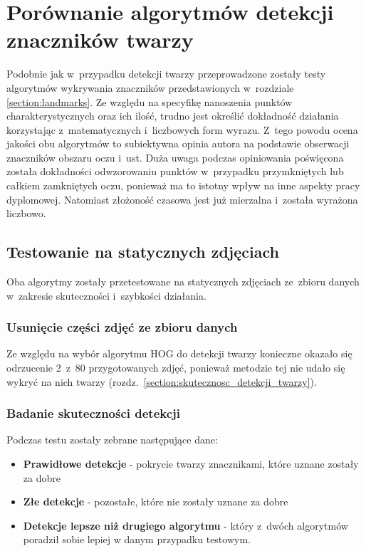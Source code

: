 \newpage

\section{Porównanie algorytmów detekcji znaczników twarzy}

Podobnie jak w~przypadku detekcji twarzy przeprowadzone zostały testy algorytmów wykrywania znaczników przedstawionych w~rozdziale \hyperref[section:landmarks]{\ref{section:landmarks}}. Ze względu na specyfikę nanoszenia punktów charakterystycznych oraz ich ilość, trudno jest określić dokładność działania korzystając z~matematycznych i~liczbowych form wyrazu. Z~tego powodu ocena jakości obu algorytmów to subiektywna opinia autora na podstawie obserwacji znaczników obszaru oczu i~ust. Duża uwaga podczas opiniowania poświęcona została dokładności odwzorowaniu punktów w~przypadku przymkniętych lub całkiem zamkniętych oczu, ponieważ ma to istotny wpływ na inne aspekty pracy dyplomowej. Natomiast złożoność czasowa jest już mierzalna i~została wyrażona liczbowo. 




\subsection{Testowanie na statycznych zdjęciach}

Oba algorytmy zostały przetestowane na statycznych zdjęciach ze~zbioru danych w~zakresie skuteczności i~szybkości działania.

\subsubsection{Usunięcie części zdjęć ze zbioru danych}

Ze względu na wybór algorytmu HOG do detekcji twarzy konieczne okazało się odrzucenie 2~z~80 przygotowanych zdjęć, ponieważ metodzie tej nie udało się wykryć na nich twarzy (rozdz.~\hyperref[{section:skutecznosc_detekcji_twarzy}]{\ref{section:skutecznosc_detekcji_twarzy}}).

\subsubsection{Badanie skuteczności detekcji}

Podczas testu zostały zebrane następujące dane:

\begin{itemize}
    \item \textbf{Prawidłowe detekcje} - pokrycie twarzy znacznikami, które uznane zostały za dobre
    \item \textbf{Złe detekcje} - pozostałe, które nie zostały uznane za dobre
    \item \textbf{Detekcje lepsze niż drugiego algorytmu} - który z~dwóch algorytmów poradził sobie lepiej w danym przypadku testowym. 
\end{itemize}


